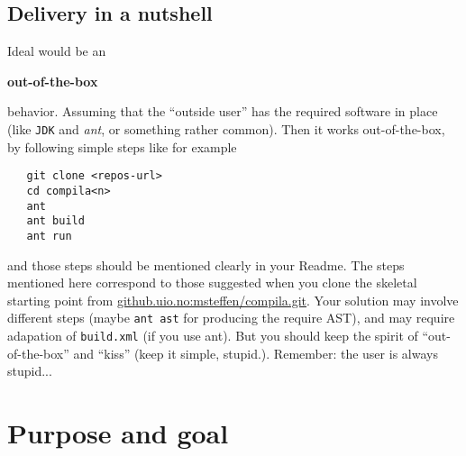 \documentclass[10pt,freeform]{handout}[2014/08/13]
\begin{document}
\subsection{Delivery in a nutshell}
\label{sec:delivery-nutshell}


Ideal would be an 
\begin{center}
  \textbf{out-of-the-box}
\end{center}
behavior. Assuming that the ``outside user'' has the required software in
place (like \texttt{JDK} and \emph{ant}, or something rather common). Then
it works out-of-the-box, by following simple steps like for example


\begin{verbatim}
   git clone <repos-url>
   cd compila<n>
   ant
   ant build
   ant run
\end{verbatim}
and those steps should be mentioned clearly in your Readme. The steps
mentioned here correspond to those suggested when you clone the skeletal
starting point from \url{github.uio.no:msteffen/compila.git}. Your solution
may involve different steps (maybe \texttt{ant ast} for producing the
require AST), and may require adapation of \texttt{build.xml} (if you use
ant). But you should keep the spirit of ``out-of-the-box'' and ``kiss''
(keep it simple, stupid.). Remember: the user is always stupid...





\section{Purpose and goal}
\label{sec:x}
\end{document}
